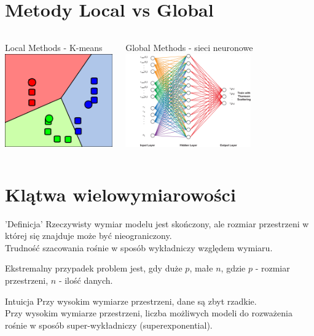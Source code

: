 \documentclass[a4paper]{beamer}
\begin{document}
\section{Metody Local vs Global}
\begin{frame}
\begin{columns}
\begin{block}{Local Methods}
- K-means \\[0.2cm]
\includegraphics[height=4cm]{kmeans.png}
\end{block}
\begin{block}{Global Methods}
- sieci neuronowe \\[0.2cm]
\includegraphics[height=4cm]{neuralnetwork.png}
\end{block}
\end{columns}
\end{frame}

\section{Klątwa wielowymiarowości}
\begin{frame}
\begin{block}{'Definicja'}
Rzeczywisty wymiar modelu jest skończony, ale rozmiar przestrzeni w której się znajduje może być nieograniczony. \\
Trudność szacowania rośnie w sposób wykładniczy względem wymiaru.
\end{block}
Ekstremalny przypadek problem jest, gdy duże $p$, małe $n$, gdzie $p$ - rozmiar przestrzeni, $n$ - ilość danych.
\begin{block}{Intuicja}
Przy wysokim wymiarze przestrzeni, dane są zbyt rzadkie. \\
Przy wysokim wymiarze przestrzeni, liczba możliwych modeli do rozważenia rośnie w sposób super-wykładniczy (superexponential).

\end{block}
\end{frame}
\end{document}
